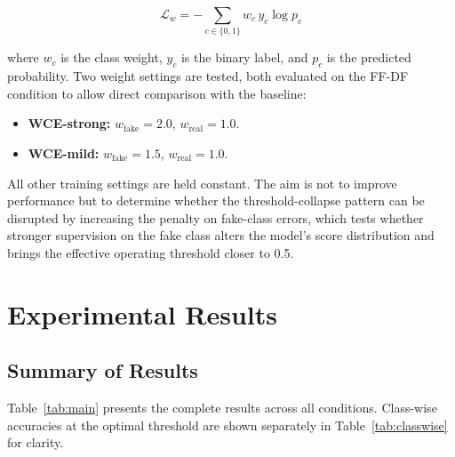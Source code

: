 \documentclass[a4paper,12pt]{report}
\begin{document}
\begin{equation}
  \mathcal{L}_w = - \sum_{c \in \{0,1\}}
    w_c \, y_c \log p_c
  \label{eq:wce}
\end{equation}

where $w_c$ is the class weight, $y_c$ is the binary label,
and $p_c$ is the predicted probability.
Two weight settings are tested, both evaluated on the FF-DF
condition to allow direct comparison with the baseline:
\begin{itemize}
  \item \textbf{WCE-strong:} $w_{\text{fake}} = 2.0$,
        $w_{\text{real}} = 1.0$.
  \item \textbf{WCE-mild:}   $w_{\text{fake}} = 1.5$,
        $w_{\text{real}} = 1.0$.
\end{itemize}
All other training settings are held constant.
The aim is not to improve performance but to determine
whether the threshold-collapse pattern can be disrupted
by increasing the penalty on fake-class errors, which
tests whether stronger supervision on the fake class
alters the model's score distribution and brings the
effective operating threshold closer to 0.5.

\chapter{Experimental Results}

\section{Summary of Results}

Table~\ref{tab:main} presents the complete results across
all conditions.
Class-wise accuracies at the optimal threshold are shown
separately in Table~\ref{tab:classwise} for clarity.
\end{document}
